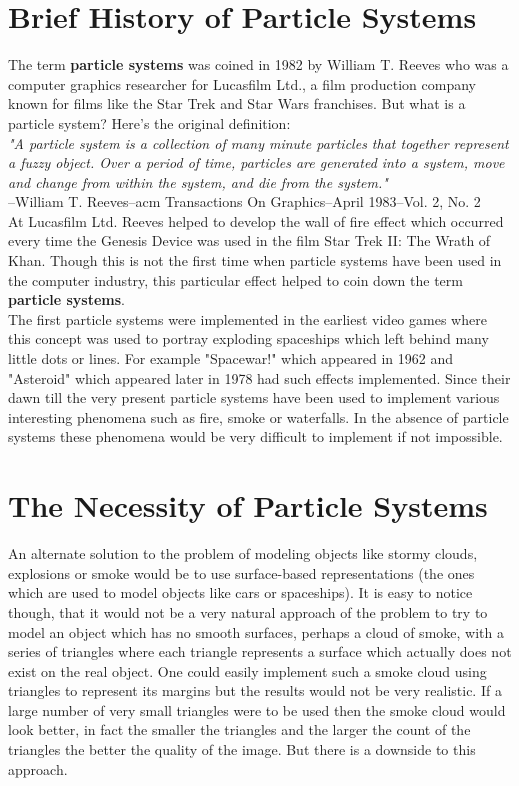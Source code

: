 \section{Brief History of Particle Systems}
The term \textbf{particle systems} was coined in 1982 by William T. Reeves who was a computer graphics researcher for Lucasfilm Ltd., a film production company known for films like the Star Trek and Star Wars franchises. But what is a particle system? Here's the original definition:\\

\textit{"A particle system is a collection of many minute particles that together represent a fuzzy object. Over a period of time, particles are generated into a system, move and change from within the system, and die from the system."}\\

--William T. Reeves--acm Transactions On Graphics--April 1983--Vol. 2, No. 2\\

At Lucasfilm Ltd. Reeves helped to develop the wall of fire effect which occurred every time the Genesis Device was used in the film Star Trek II: The Wrath of Khan. Though this is not the first time when particle systems have been used in the computer industry, this particular effect helped to coin down the term \textbf{particle systems}.\\

The first particle systems were implemented in the earliest video games where this concept was used to portray exploding spaceships which left behind many little dots or lines. For example "Spacewar!" which appeared in 1962 and "Asteroid" which appeared later in 1978 had such effects implemented. Since their dawn till the very present particle systems have been used to implement various interesting phenomena such as fire, smoke or waterfalls. In the absence of particle systems these phenomena would be very difficult to implement if not impossible.\\
\newpage
\section{The Necessity of Particle Systems}
An alternate solution to the problem of modeling objects like stormy clouds, explosions or smoke would be to use surface-based representations (the ones which are used to model objects like cars or spaceships). It is easy to notice though, that it would not be a very natural approach of the problem to try to model an object which has no smooth surfaces, perhaps a cloud of smoke, with a series of triangles where each triangle represents a surface which actually does not exist on the real object. One could easily implement such a smoke cloud using triangles to represent its margins but the results would not be very realistic. If a large number of very small triangles were to be used then the smoke cloud would look better, in fact the smaller the triangles and the larger the count of the triangles the better the quality of the image. But there is a downside to this approach.\\

